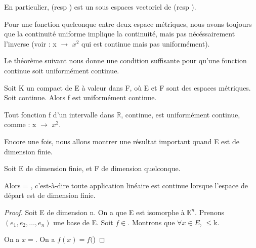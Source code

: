 En particulier,  (resp ) est un sous
espaces vectoriel de  (resp ).

\begin{remarque}
	Pour une fonction quelconque entre deux espace métriques, nous avons
	toujours que la continuité uniforme implique la continuité, mais pas
	nécéssairement l'inverse (voir  : x $\rightarrow$ $x^2$ qui est continue mais pas uniformément).
\end{remarque}

Le théorème suivant nous donne une condition suffisante pour qu'une fonction
continue soit uniformément continue.

\begin{theorem} [Heine]
	Soit K un compact de E à valeur dans F, où E et F sont des espaces
	métriques. Soit  continue. Alors f est uniformément
	continue.
	\label{Heine}
\end{theorem}

\begin{exemple}
	Tout fonction f d'un intervalle  dans $\mathbb{R}$, continue, est
	uniformément continue, comme
	 : x $\rightarrow$ $x^2$.
\end{exemple}

Encore une fois, nous allons montrer une résultat important quand E est de
dimension finie.

\begin{proposition}
	Soit E de dimension finie, et F de dimension quelconque.
	
	Alors  = , c'est-à-dire toute
	application linéaire est continue lorsque l'espace de départ est de
	dimension finie.
\end{proposition}

\begin{proof}
	Soit E de dimension n.
	On a que E est isomorphe à $\mathbb{K}^{n}$. Prenons $(e_{1}, e_{2}, \ldots,
	e_{n})$ une base de E.
	Soit $f \in $. Montrons que $\forall x \in E$,
	$ \leq $k.

	On a $x = $.
	On a $f(x) = f($)
\end{proof}
